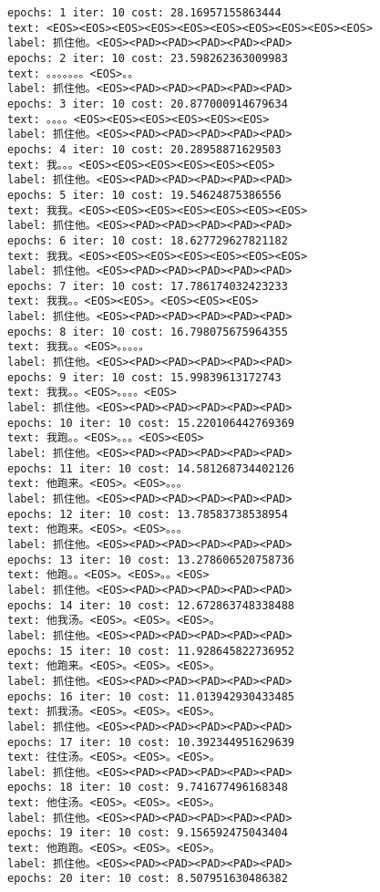 \documentclass[11pt]{article}
\begin{document}
    \begin{Verbatim}[commandchars=\\\{\}]
epochs: 1 iter: 10 cost: 28.16957155863444
text: <EOS><EOS><EOS><EOS><EOS><EOS><EOS><EOS><EOS><EOS>
label: 抓住他。<EOS><PAD><PAD><PAD><PAD><PAD>
epochs: 2 iter: 10 cost: 23.598262363009983
text: 。。。。。。。<EOS>。。
label: 抓住他。<EOS><PAD><PAD><PAD><PAD><PAD>
epochs: 3 iter: 10 cost: 20.877000914679634
text: 。。。。<EOS><EOS><EOS><EOS><EOS><EOS>
label: 抓住他。<EOS><PAD><PAD><PAD><PAD><PAD>
epochs: 4 iter: 10 cost: 20.28958871629503
text: 我。。。<EOS><EOS><EOS><EOS><EOS><EOS>
label: 抓住他。<EOS><PAD><PAD><PAD><PAD><PAD>
epochs: 5 iter: 10 cost: 19.54624875386556
text: 我我。<EOS><EOS><EOS><EOS><EOS><EOS><EOS>
label: 抓住他。<EOS><PAD><PAD><PAD><PAD><PAD>
epochs: 6 iter: 10 cost: 18.627729627821182
text: 我我。<EOS><EOS><EOS><EOS><EOS><EOS><EOS>
label: 抓住他。<EOS><PAD><PAD><PAD><PAD><PAD>
epochs: 7 iter: 10 cost: 17.786174032423233
text: 我我。。<EOS><EOS>。<EOS><EOS><EOS>
label: 抓住他。<EOS><PAD><PAD><PAD><PAD><PAD>
epochs: 8 iter: 10 cost: 16.798075675964355
text: 我我。。<EOS>。。。。。
label: 抓住他。<EOS><PAD><PAD><PAD><PAD><PAD>
epochs: 9 iter: 10 cost: 15.99839613172743
text: 我我。。<EOS>。。。。<EOS>
label: 抓住他。<EOS><PAD><PAD><PAD><PAD><PAD>
epochs: 10 iter: 10 cost: 15.220106442769369
text: 我跑。。<EOS>。。。<EOS><EOS>
label: 抓住他。<EOS><PAD><PAD><PAD><PAD><PAD>
epochs: 11 iter: 10 cost: 14.581268734402126
text: 他跑来。<EOS>。<EOS>。。。
label: 抓住他。<EOS><PAD><PAD><PAD><PAD><PAD>
epochs: 12 iter: 10 cost: 13.78583738538954
text: 他跑来。<EOS>。<EOS>。。。
label: 抓住他。<EOS><PAD><PAD><PAD><PAD><PAD>
epochs: 13 iter: 10 cost: 13.278606520758736
text: 他跑。。<EOS>。<EOS>。。<EOS>
label: 抓住他。<EOS><PAD><PAD><PAD><PAD><PAD>
epochs: 14 iter: 10 cost: 12.672863748338488
text: 他我汤。<EOS>。<EOS>。<EOS>。
label: 抓住他。<EOS><PAD><PAD><PAD><PAD><PAD>
epochs: 15 iter: 10 cost: 11.928645822736952
text: 他跑来。<EOS>。<EOS>。<EOS>。
label: 抓住他。<EOS><PAD><PAD><PAD><PAD><PAD>
epochs: 16 iter: 10 cost: 11.013942930433485
text: 抓我汤。<EOS>。<EOS>。<EOS>。
label: 抓住他。<EOS><PAD><PAD><PAD><PAD><PAD>
epochs: 17 iter: 10 cost: 10.392344951629639
text: 往住汤。<EOS>。<EOS>。<EOS>。
label: 抓住他。<EOS><PAD><PAD><PAD><PAD><PAD>
epochs: 18 iter: 10 cost: 9.741677496168348
text: 他住汤。<EOS>。<EOS>。<EOS>。
label: 抓住他。<EOS><PAD><PAD><PAD><PAD><PAD>
epochs: 19 iter: 10 cost: 9.156592475043404
text: 他跑跑。<EOS>。<EOS>。<EOS>。
label: 抓住他。<EOS><PAD><PAD><PAD><PAD><PAD>
epochs: 20 iter: 10 cost: 8.507951630486382

\end{Verbatim}
\end{document}
